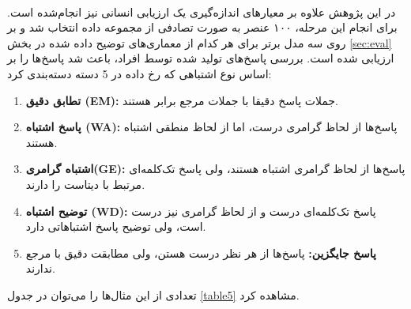 \paragraph{}
{
    در این پژوهش علاوه بر معیارهای اندازه‌گیری یک ارزیابی انسانی نیز
    انجام‌شده است. برای انجام این مرحله، ۱۰۰ عنصر به صورت تصادفی از 
    مجموعه داده انتخاب شد و بر روی سه مدل برتر برای هر کدام از معماری‌های 
    توضیح داده شده در بخش 
    \ref{sec:eval}
    ارزیابی شده است.
    بررسی پاسخ‌های تولید شده توسط افراد، باعث شد پاسخ‌ها را بر اساس نوع اشتباهی که رخ داده 
    در 5 دسته دسته‌بندی کرد:
    \begin{enumerate}
        \item \textbf{تطابق دقیق (EM): }
                جملات پاسخ دقیقا با جملات مرجع برابر هستند. 
        \item \textbf{پاسخ اشتباه (WA): }
                پاسخ‌ها از لحاظ گرامری درست، اما از لحاظ منطقی اشتباه هستند.
        \item \textbf{ اشتباه گرامری(GE): }
                پاسخ‌ها از لحاظ گرامری اشتباه هستند، ولی پاسخ تک‌کلمه‌ای
                مرتبط با دیتاست را دارند.
        \item \textbf{توضیح اشتباه (WD):}
                پاسخ تک‌کلمه‌ای درست و از لحاظ گرامری نیز درست است، ولی 
                توضیح پاسخ اشتباهاتی دارد. 
        \item \textbf{پاسخ جایگزین: }
                پاسخ‌ها از هر نظر درست هستن، ولی مطابقت دقیق با مرجع ندارند.           
    \end{enumerate}
    تعدادی از این مثال‌ها را می‌توان در جدول 
    \ref{table5}
    مشاهده کرد.

}

